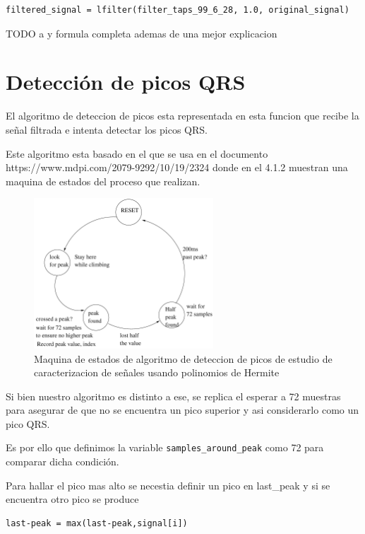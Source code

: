 \lstset{language=python, breaklines=true, basicstyle=\footnotesize}
\begin{lstlisting}[frame=single]
    filtered_signal = lfilter(filter_taps_99_6_28, 1.0, original_signal)
\end{lstlisting}
TODO a y formula completa ademas de una mejor explicacion

\section{Detección de picos QRS}

El algoritmo de deteccion de picos esta representada en esta funcion que 
recibe la señal filtrada e intenta detectar los picos QRS.

Este algoritmo esta basado en el que se usa en el documento  https://www.mdpi.com/2079-9292/10/19/2324 
donde en el 4.1.2 muestran una maquina de estados del proceso que realizan.

\begin{figure}[h!]
    \centering
    \includegraphics[width=0.6\textwidth]{./Images/img_algoritmo/fsm_mdpi.png}
    \caption{Maquina de estados de algoritmo de deteccion de picos de estudio de caracterizacion de señales usando polinomios de Hermite}
    \label{fig:fsm_mpdi}
\end{figure}

Si bien nuestro algoritmo es distinto a ese, se replica el esperar a 72 muestras
para asegurar de que no se encuentra un pico superior y asi considerarlo como un pico QRS.

Es por ello que definimos la variable \lstinline|samples_around_peak| como 72 para comparar dicha condición.

Para hallar el pico mas alto se necestia definir un pico en last\_peak y si se encuentra otro pico se produce

\lstset{language=python, breaklines=true, basicstyle=\footnotesize}
\begin{lstlisting}[frame=single]
last-peak = max(last-peak,signal[i])
\end{lstlisting}

